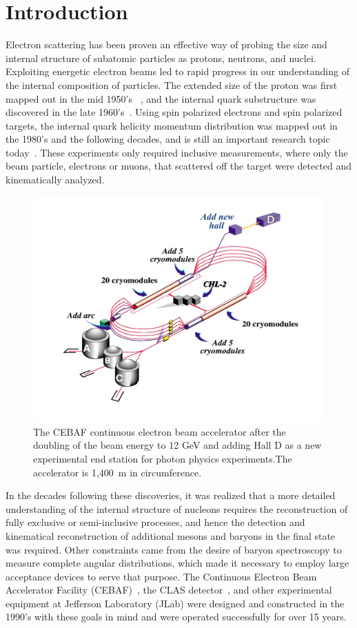 \documentclass[final,3p,twocolumn]{elsarticle}
\begin{document}
\linenumbers
\section{Introduction}

Electron scattering has been proven an effective way of probing the size and internal structure of subatomic particles as protons, neutrons, and nuclei. Exploiting energetic electron beams led to rapid progress in our understanding of the internal composition of particles. The extended size of the proton was first mapped out in the mid 1950's~\cite{Mcallister:1956ng} , and the internal quark substructure was discovered in the late 1960's~\cite{Breidenbach:1969kd}. Using spin polarized electrons and spin polarized targets, the internal quark helicity momentum distribution was mapped out in the 1980's and the following decades, and is still an important research topic today~\cite{Kuhn:2008sy}. These experiments only required inclusive measurements, where only the beam particle, electrons or muons, that scattered off the target were detected and kinematically analyzed.  
\begin{figure}[ht]
\centerline{\includegraphics[width=1.8\columnwidth]{cebaf.pdf}}
\caption{The CEBAF continuous electron beam accelerator after the doubling of the beam energy to 12 GeV and 
adding Hall D as a new experimental end station for photon physics experiments.The accelerator is 1,400~m in circumference. }
\label{cebaf12}
\end{figure} 
In the decades following these discoveries, it was realized that a more detailed understanding of the internal structure of nucleons requires  the 
reconstruction of fully exclusive or semi-inclusive processes, and hence the detection and kinematical reconstruction of additional mesons and baryons in the final state was required.  Other constraints came from the desire of baryon spectroscopy to 
measure complete angular distributions, which made it necessary to employ large acceptance devices to serve that purpose. 
The Continuous Electron Beam Accelerator Facility (CEBAF)~\cite{Leemann:2001dg}, the CLAS detector~\cite{Mecking:2003zu}, and other experimental equipment at Jefferson Laboratory (JLab) were designed and constructed in the 1990's with these
goals in mind and were operated successfully for over 15 years. 
 
\end{document}
